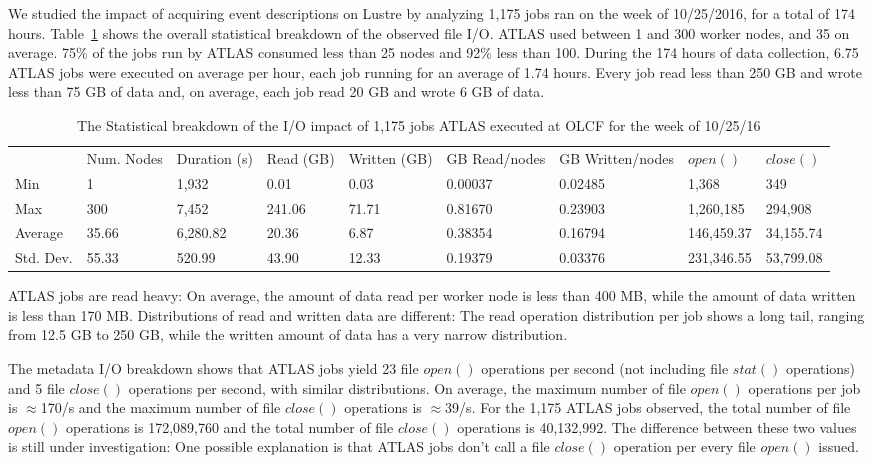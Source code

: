 We studied the impact of acquiring event descriptions on Lustre by analyzing
1,175 jobs ran on the week of 10/25/2016, for a total of 174 hours.
Table~\ref{panda-olcf-stats} shows the overall statistical breakdown of the
observed file I/O. ATLAS used between 1 and 300 worker nodes, and 35 on
average. 75\% of the jobs run by ATLAS consumed less than 25 nodes and 92\%
less than 100. During the 174 hours of data collection, 6.75 ATLAS jobs were
executed on average per hour, each job running for an average of 1.74 hours.
Every job read less than 250 GB and wrote less than 75 GB of data and, on
average, each job read 20 GB and wrote 6 GB of data.

\begin{table}[t]
\centering
\begin{tabular}{lllllllll} & Num. Nodes & Duration (s) & Read (GB) & Written
 (GB) & GB Read/nodes & GB Written/nodes & \(open()\) & \(close()\) \\ Min & 1 &
 1,932 & 0.01 & 0.03 & 0.00037 & 0.02485 & 1,368 & 349 \\ Max & 300 & 7,452 &
 241.06 & 71.71 & 0.81670 & 0.23903 & 1,260,185 & 294,908 \\ Average & 35.66
 & 6,280.82 & 20.36 & 6.87 & 0.38354 & 0.16794 & 146,459.37 & 34,155.74 \\
 Std. Dev. & 55.33 & 520.99 & 43.90 & 12.33 & 0.19379 & 0.03376 & 231,346.55
 & 53,799.08
\end{tabular}
\caption{The Statistical breakdown of the I/O impact of 1,175 jobs ATLAS
executed at OLCF for the week of 10/25/16}\label{panda-olcf-stats}
\end{table}

ATLAS jobs are read heavy: On average, the amount of data read per worker
node is less than 400 MB, while the amount of data written is less than 170
MB\@. Distributions of read and written data are different: The read
operation distribution per job shows a long tail, ranging from 12.5 GB to 250
GB, while the written amount of data has a very narrow distribution.

The metadata I/O breakdown shows that ATLAS jobs yield 23 file \(open()\)
operations per second (not including file \(stat()\) operations) and 5 file
\(close()\) operations per second, with similar distributions. On average,
the maximum number of file \(open()\) operations per job is \(\approx\)170/s
and the maximum number of file \(close()\) operations is \(\approx\)39/s. For
the 1,175 ATLAS jobs observed, the total number of file \(open()\) operations
is 172,089,760 and the total number of file \(close()\) operations is
40,132,992. The difference between these two values is still under
investigation: One possible explanation is that ATLAS jobs don't call a file
\(close()\) operation per every file \(open()\) issued.

